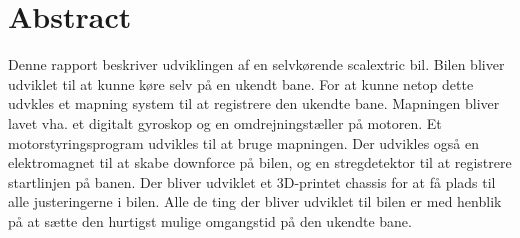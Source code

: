 \section{Abstract}
Denne rapport beskriver udviklingen af en selvkørende scalextric bil. Bilen bliver udviklet til at kunne køre selv på en ukendt bane. For at kunne netop dette udvkles et mapning system til at registrere den ukendte bane. Mapningen bliver lavet vha. et digitalt gyroskop og en omdrejningstæller på motoren. Et motorstyringsprogram udvikles til at bruge mapningen. Der udvikles også en elektromagnet til at skabe downforce på bilen, og en stregdetektor til at registrere startlinjen på banen. Der bliver udviklet et 3D-printet chassis for at få plads til alle justeringerne i bilen. Alle de ting der bliver udviklet til bilen er med henblik på at sætte den hurtigst mulige omgangstid på den ukendte bane. 